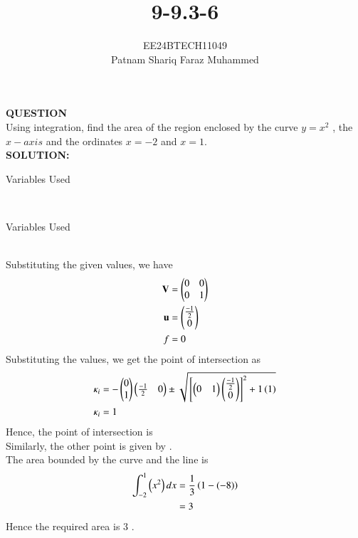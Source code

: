 \documentclass[journal]{IEEEtran}
\numberwithin{equation}{enumi}
\numberwithin{figure}{enumi}
\begin{document}


\title{9-9.3-6}
\author{EE24BTECH11049 \\ Patnam Shariq Faraz Muhammed}

{\let\newpage\relax\maketitle}

\textbf{QUESTION} \\
    Using integration, find the area of the region enclosed by the curve $y = x^2$ , the $x-axis$ and the ordinates $x = - 2$ and $x = 1$.\\
\textbf{SOLUTION:} \\
    \begin{table}[h!]    
      \centering
      
      \caption{Variables Used}
      \label{table: 9-9.3-6}
    \end{table}\\

    \begin{table}[h!]    
      \centering
      
      \caption{Variables Used}
      \label{table: 9-9.3-6}
    \end{table}\\
    Substituting the given values, we have \\
\begin{align}
	\mathbf{V} &= \begin{pmatrix} 0 & 0 \\ 0 & 1 \end{pmatrix} \\
	\mathbf{u} &= \begin{pmatrix} \frac{-1}{2} \\ 0 \end{pmatrix} \\
	f &= 0 \\
\end{align}
Substituting the values, we get the point of intersection as \\
\begin{align}
	\kappa_i &= -\begin{pmatrix}0 \\ 1\end{pmatrix}\begin{pmatrix}\frac{-1}{2} & 0\end{pmatrix} \pm \sqrt{{}\left[\begin{pmatrix}0 & 1\end{pmatrix}\begin{pmatrix} \frac{-1}{2} \\ 0\end{pmatrix} \right]^2 + 1\left(1\right)} \\
	\kappa_i &= 1 \\
\end{align}
Hence, the point of intersection is  \\
Similarly, the other point is given by  .\\
The area bounded by the curve and the line is \\
\begin{align}
	\int_{-2}^{1} \left(x^2\right) dx &= \frac{1}{3}\left( 1 - (-8) \right) \\
	&= 3 \\
\end{align}
Hence the required area is $3$ .
	
\end{document}
